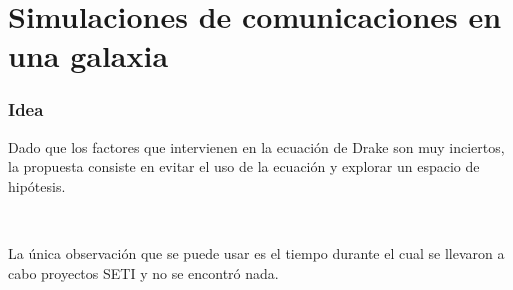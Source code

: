 \documentclass[handout]{beamer}
\theoremstyle{plain}
\theoremstyle{definition}
\theoremstyle{remark}
\begin{document}
% 
%           
%
%
%
%
%
%
%
%
%
%
%



\section{Simulaciones de comunicaciones en una galaxia}

\begin{frame}\frametitle{Idea}

   Dado que los factores que intervienen en la ecuación de Drake son
   muy inciertos, la propuesta consiste en evitar el uso de la
   ecuación y explorar un espacio de hipótesis.

   \ 

   La única observación que se puede usar es el tiempo durante el cual
   se llevaron a cabo proyectos SETI y no se encontró nada.

\end{frame}
 
\end{document}
